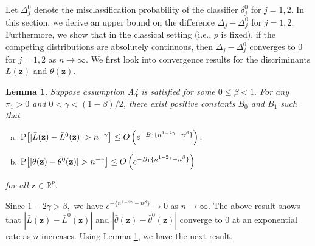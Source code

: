 \documentclass[twoside]{article}
\newcommand{\bF}{\mathbf{F}}
\newcommand{\bz}{\mathbf{z}}
\newcommand{\0}{\mathbf{0}}
\newcommand{\1}{\mathbf{1}}
\numberwithin{equation}{section}
\newtheorem{lemma}[thm]{Lemma}
\begin{document}
Let $\Delta^0_j$ denote the misclassification probability of the classifier $\delta^0_j$ for $ j=1,2.$ In this section, we derive an upper bound on the difference $\Delta_j-\Delta^0_j$ for $j=1,2.$ Furthermore, we show that in the classical setting (i.e., $p$ is fixed), if the competing distributions are absolutely continuous, then $\Delta_j-\Delta^0_j$ converges to 0 for $j=1,2$ as $n\to\infty.$ We first look into convergence results for the discriminants $\bar{L}(\bz)$ and $\bar{\theta}(\bz).$ %
\begin{lemma}\label{exbdLtheta}
Suppose assumption {\rm A4} is satisfied for some $0\le \beta <1.$ For any $\pi_1 >0$ and $0<\gamma <(1-\beta)/2$, there exist positive constants $B_0$ and $B_1$ such that
\vspace{-0.25cm}
\begin{enumerate}[(a)]
 \item $ {\rm P}\big [|\bar{L}(\bz) - \bar{L}^0(\bz)|>n^{-\gamma}  \big]\leq O\left (e^{-B_0\{ n^{1-2\gamma}-n^\beta\}}\right ),$
 \item ${\rm P}\big [|\bar{\theta}(\bz) - \bar{\theta}^0(\bz)|>n^{-\gamma} \big]\leq O\left ( e^{-B_1\{ n^{1-2\gamma}-n^\beta\}}\right )$
\end{enumerate}
\vspace{-0.25cm}
for all $\bz\in\mathbb{R}^{p}.$
\end{lemma}
\vspace{-0.25cm}
Since $1-2\gamma>\beta,$ we have $e^{-\{n^{1-2\gamma}-n^\beta\}}\to 0$ as $n\to\infty.$ The above result shows that $|\bar{L}(\bz)-\bar{L}^0(\bz)|$ and $|\bar{\theta}(\bz)-\bar{\theta}^0(\bz)|$ converge to 0 at an exponential rate as $n$ increases. Using Lemma \ref{exbdLtheta}, we have the next result.
\end{document}
